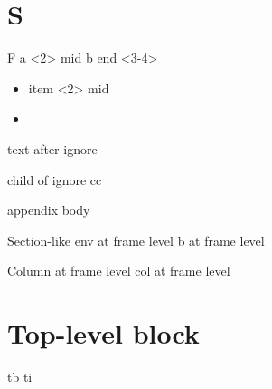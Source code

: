 \documentclass[presentation]{beamer}
\author{root}
\date{\today}
\title{}
\begin{document}
\section{S}
\label{sec:org7cd493b}
\begin{frame}[label={sec:org200ef74}]{F}
a <2> mid \alert{b} \pause end <3-4>
\begin{itemize}
\item item <2> mid
\item<2> 
\end{itemize}
\end{frame}
text after ignore
\begin{block}{child of ignore}
cc
\end{block}
\appendix
appendix body
\begin{frame}[label={sec:org960eac8}]{}
\end{frame}
\begin{frame}[label={sec:org36fe993}]{Section-like env at frame level}
b at frame level
\end{frame}
\begin{frame}[label={sec:orgc644249}]{Column at frame level}
col at frame level
\end{frame}
\section{Top-level block}
\label{sec:orgea6ea9c}
tb
ti
\end{document}
